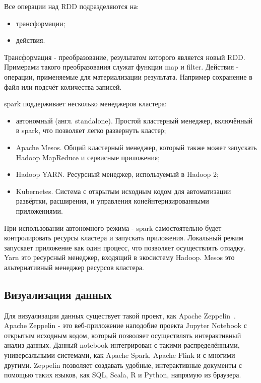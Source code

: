 Все операции над RDD подразделяются на:
\begin{itemize}
    \item трансформации;
    \item действия.
\end{itemize}

Трансформация - преобразование, результатом которого является новый RDD. 
Примерами такого преобразования служат функции map и filter.
Действия - операции, применяемые для материализации результата.
Например сохранение в файл или подсчёт количества записей.

spark поддерживает несколько менеджеров кластера:
\begin{itemize}
    \item автономный (англ. standalone). Простой кластерный менеджер, включённый в spark, что позволяет легко развернуть кластер;
    \item Apache Mesos. Общий кластерный менеджер, который также может запускать Hadoop MapReduce и сервисные приложения;
    \item Hadoop YARN. Ресурсный менеджер, используемый в Hadoop 2;
    \item Kubernetes. Система с открытым исходным кодом для автоматизации развёртки, расширения, и управления конейнтеризированными приложениями.
\end{itemize}

При использовании автономного режима - spark самостоятельно будет контролировать ресурсы кластера и запускать приложения.
Локальный режим запускает приложение как один процесс, что позволяет осуществлять отладку.
Yarn это ресурсный менеджер, входящий в экосистему Hadoop.
Mesos это альтернативный менеджер ресурсов кластера.
    
\subsection{Визуализация данных}

Для визуализации данных существует такой проект, как Apache Zeppelin~\cite{zeppelin_documentation_intro}.
Apache Zeppelin - это веб-приложение наподобие проекта Jupyter Notebook с открытым исходным кодом, который  позволяет осуществлять интерактивный анализ данных.
Данный notebook интегрирован с такими распределёнными, универсальными системами, как Apache Spark, Apache Flink и с многими другими.
Zeppelin позволяет создавать удобные, интерактивные документы с помощью таких языков, как SQL, Scala, R и Python, напрямую из браузера.

